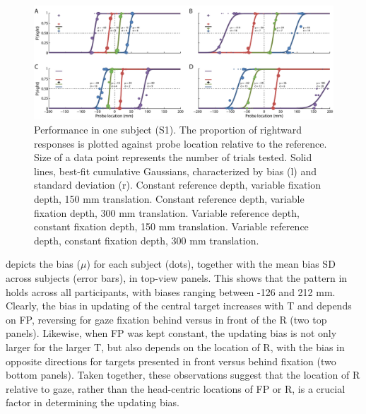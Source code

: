 \begin{figure}
    \includegraphics[width=1.0\textwidth]{src/paper2/figure2.pdf}
    
    \caption{Performance in one subject (S1). The proportion of rightward responses is plotted against probe location relative to the reference. Size of a data point represents the number of trials tested. Solid lines, best-fit cumulative Gaussians, characterized by bias (l) and standard deviation (r).  Constant reference depth, variable fixation depth, 150 \si{\milli\metre} translation.  Constant reference depth, variable fixation depth, 300 \si{\milli\metre} translation.  Variable reference depth, constant fixation depth, 150 \si{\milli\metre} translation.  Variable reference depth, constant fixation depth, 300 \si{\milli\metre}  translation.}
    
    \label{p2:fig2}
\end{figure}

 depicts the bias ($\mu$) for each subject (dots), together with the mean bias {\textpm}SD across subjects (error bars), in top-view panels. This shows that the pattern in  holds across all participants, with biases ranging between -126 and 212 mm. Clearly, the bias in updating of the central target increases with T and depends on FP, reversing for gaze fixation behind versus in front of the R (two top panels). Likewise, when FP was kept constant, the updating bias is not only larger for the larger T, but also depends on the location of R, with the bias in opposite directions for targets presented in front versus behind fixation (two bottom panels). Taken together, these observations suggest that the location of R relative to gaze, rather than the head-centric locations of FP or R, is a crucial factor in determining the updating bias. 

